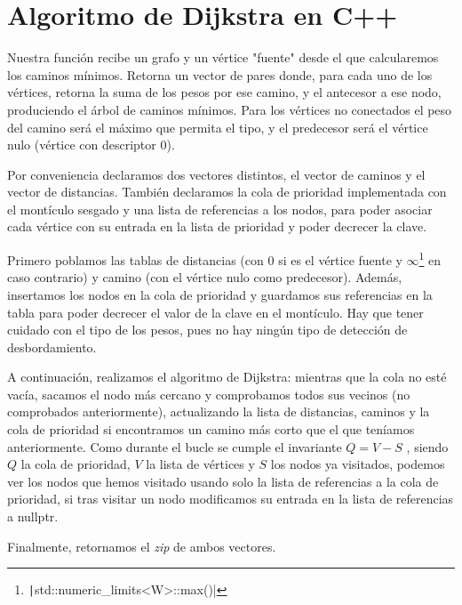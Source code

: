 \documentclass{article}
\begin{document}
\section{Algoritmo de Dijkstra en C++}
Nuestra función recibe un grafo y un vértice "fuente" desde el que calcularemos los caminos mínimos. Retorna un vector de pares donde, para cada uno de los vértices, retorna la suma de los pesos por ese camino, y el antecesor a ese nodo, produciendo el árbol de caminos mínimos. Para los vértices no conectados el peso del camino será el máximo que permita el tipo, y el predecesor será el vértice nulo (vértice con descriptor 0).

Por conveniencia declaramos dos vectores distintos, el vector de caminos y el vector de distancias. También declaramos la cola de prioridad implementada con el montículo sesgado y una lista de referencias a los nodos, para poder asociar cada vértice con su entrada en la lista de prioridad y poder decrecer la clave.

Primero poblamos las tablas de distancias (con 0 si es el vértice fuente y $\infty$\footnote{\texttt|std::numeric_limits<W>::max()|} en caso contrario) y camino (con el vértice nulo como predecesor). Además, insertamos los nodos en la cola de prioridad y guardamos sus referencias en la tabla para poder decrecer el valor de la clave en el montículo. Hay que tener cuidado con el tipo de los pesos, pues no hay ningún tipo de detección de desbordamiento.

A continuación, realizamos el algoritmo de Dijkstra: mientras que la cola no esté vacía, sacamos el nodo más cercano y comprobamos todos sus vecinos (no comprobados anteriormente), actualizando la lista de distancias, caminos y la cola de prioridad si encontramos un camino más corto que el que teníamos anteriormente. Como durante el bucle se cumple el invariante $Q = V - S$ \cite{CormenDijsktra}, siendo $Q$ la cola de prioridad, $V$ la lista de vértices y $S$ los nodos ya visitados, podemos ver los nodos que hemos visitado usando solo la lista de referencias a la cola de prioridad, si tras visitar un nodo modificamos su entrada en la lista de referencias a nullptr.

Finalmente, retornamos el \textit{zip} de ambos vectores.
\end{document}
